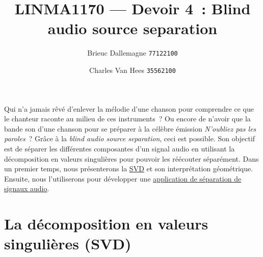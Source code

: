 \documentclass[a4paper, 11pt]{article}
\title{\vspace{-1cm} LINMA1170 --- Devoir 4~: Blind audio source separation}
\author{Brieuc Dallemagne \texttt{77122100} \and Charles Van Hees \texttt{35562100}}
\date{}
\begin{document}
\maketitle

Qui n'a jamais rêvé d'enlever la mélodie d'une chanson pour comprendre ce que le chanteur raconte au milieu de ces instruments~? Ou encore de n'avoir que la bande son d'une chanson pour se préparer à la célèbre émission \textit{N'oubliez pas les paroles}~? Grâce à la \textit{blind audio source separation}, ceci est possible. Son objectif est de séparer les différentes composantes d'un signal audio en utilisant la décomposition en valeurs singulières pour pouvoir les réécouter séparément. Dans un premier temps, nous présenterons la \hyperref[sec:SVD]{SVD} et son interprétation géométrique. Ensuite, nous l'utiliserons pour développer une \hyperref[sec:BASS]{application de séparation de signaux audio}.

\section{La décomposition en valeurs singulières (SVD)}\label{sec:SVD}
\end{document}
